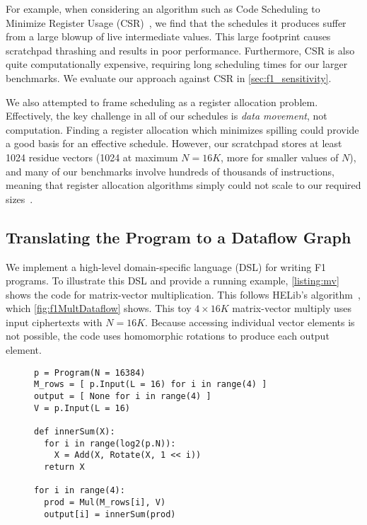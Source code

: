 For example, when considering an algorithm such as Code Scheduling to Minimize
Register Usage (CSR)~\cite{goodman:ics1988:code}, we find that the schedules it
produces suffer from a large blowup of live intermediate values. This large
footprint causes scratchpad thrashing and results in poor performance.
Furthermore, CSR is also quite computationally expensive, requiring long
scheduling times for our larger benchmarks. We evaluate our approach against
CSR in \autoref{sec:f1_sensitivity}.

We also attempted to frame scheduling as a register allocation problem.
Effectively, the key challenge in all of our schedules is \emph{data movement},
not computation. Finding a register allocation which minimizes spilling could
provide a good basis for an effective schedule. However, our scratchpad stores
at least 1024 residue vectors (1024 at maximum $N = 16K$, more for smaller
values of $N$), and many of our benchmarks involve hundreds of thousands of
instructions, meaning that register allocation algorithms simply could not
scale to our required sizes~\cite{barany:odes2011:register,
xu:sigplan2007:tetris, touati:ijpp2005:register, berson:pact1993:ursa}.

\subsection{Translating the Program to a Dataflow Graph}
\label{sec:programming}

We implement a high-level domain-specific language (DSL) for writing F1
programs. To illustrate this DSL and provide a running example,
\autoref{listing:mv} shows the code for matrix-vector multiplication. This
follows HELib's algorithm~\cite{halevi:crypto14:algorithms}, which
\autoref{fig:f1MultDataflow} shows. This toy $4 \times 16K$ matrix-vector
multiply uses input ciphertexts with $N=16K$. Because accessing individual
vector elements is not possible, the code uses homomorphic rotations to produce
each output element.

\figFOneMultDataflow

\begin{figure}
\begin{center}
  \begin{lstlisting}[caption={$(4 \times 16K)$ matrix-vector multiply in F1's DSL.}, mathescape=true, style=custompython, label=listing:mv]
p = Program(N = 16384)
M_rows = [ p.Input(L = 16) for i in range(4) ]
output = [ None for i in range(4) ]
V = p.Input(L = 16)

def innerSum(X):
  for i in range(log2(p.N)):
    X = Add(X, Rotate(X, 1 << i))
  return X

for i in range(4):
  prod = Mul(M_rows[i], V)
  output[i] = innerSum(prod)
  \end{lstlisting}
\end{center}
\vspace{0.15cm}
\end{figure}

